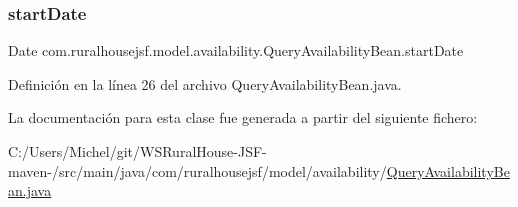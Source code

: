 \mbox{\label{classcom_1_1ruralhousejsf_1_1model_1_1availability_1_1_query_availability_bean_a1652bdd9864dc46b9c0fb5e31282032d}} 
\subsubsection{\texorpdfstring{startDate}{startDate}}
{\footnotesize\ttfamily Date com.\+ruralhousejsf.\+model.\+availability.\+Query\+Availability\+Bean.\+start\+Date\hspace{0.3cm}{\ttfamily [private]}}



Definición en la línea 26 del archivo Query\+Availability\+Bean.\+java.



La documentación para esta clase fue generada a partir del siguiente fichero\+:\begin{DoxyCompactItemize}
\item 
C\+:/\+Users/\+Michel/git/\+W\+S\+Rural\+House-\/\+J\+S\+F-\/maven-\//src/main/java/com/ruralhousejsf/model/availability/\mbox{\hyperlink{_query_availability_bean_8java}{Query\+Availability\+Bean.\+java}}\end{DoxyCompactItemize}
